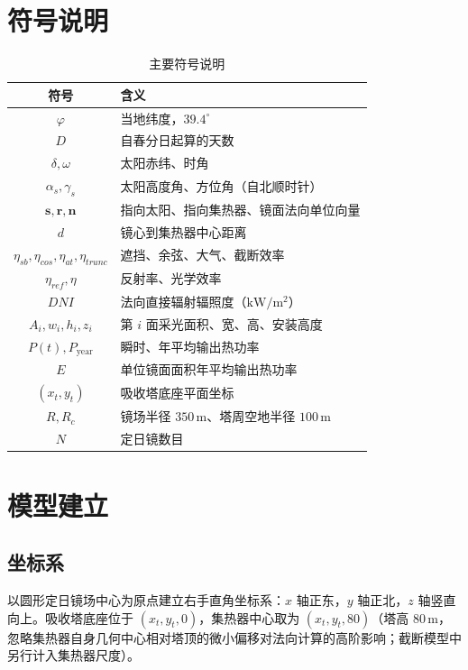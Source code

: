 \documentclass[withoutpreface,bwprint]{cumcmthesis}
\begin{document}
\section{符号说明}

\begin{table}[htbp]
\centering
\caption{主要符号说明}
\label{tab:symbol}
\begin{tabular}{cl}
\toprule
符号 & 含义 \\
\midrule
$\varphi$ & 当地纬度，$39.4^\circ$ \\
$D$ & 自春分日起算的天数 \\
$\delta,\omega$ & 太阳赤纬、时角 \\
$\alpha_s,\gamma_s$ & 太阳高度角、方位角（自北顺时针） \\
$\boldsymbol{s},\boldsymbol{r},\boldsymbol{n}$ & 指向太阳、指向集热器、镜面法向单位向量 \\
$d$ & 镜心到集热器中心距离 \\
$\eta_{sb},\eta_{cos},\eta_{at},\eta_{trunc}$ & 遮挡、余弦、大气、截断效率 \\
$\eta_{ref},\eta$ & 反射率、光学效率 \\
$DNI$ & 法向直接辐射辐照度（$\mathrm{kW/m^2}$） \\
$A_i,w_i,h_i,z_i$ & 第 $i$ 面采光面积、宽、高、安装高度 \\
$P(t),P_{\mathrm{year}}$ & 瞬时、年平均输出热功率 \\
$E$ & 单位镜面面积年平均输出热功率 \\
$(x_t,y_t)$ & 吸收塔底座平面坐标 \\
$R,R_c$ & 镜场半径 $350\,\mathrm{m}$、塔周空地半径 $100\,\mathrm{m}$ \\
$N$ & 定日镜数目 \\
\bottomrule
\end{tabular}
\end{table}

\section{模型建立}

\subsection{坐标系}
以圆形定日镜场中心为原点建立右手直角坐标系：$x$ 轴正东，$y$ 轴正北，$z$ 轴竖直向上。吸收塔底座位于 $(x_t,y_t,0)$，集热器中心取为 $(x_t,y_t,80)$（塔高 $80\,\mathrm{m}$，忽略集热器自身几何中心相对塔顶的微小偏移对法向计算的高阶影响；截断模型中另行计入集热器尺度）。
\end{document}
